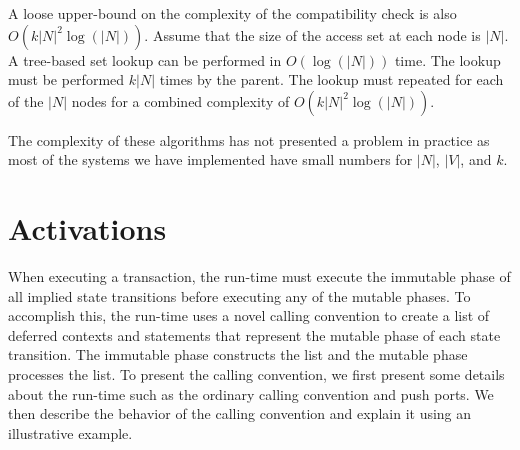 A loose upper-bound on the complexity of the compatibility check is also $O(k |N|^2 \log (|N|))$.
Assume that the size of the access set at each node is $|N|$.
A tree-based set lookup can be performed in $O(\log(|N|))$ time.
The lookup must be performed $k |N|$ times by the parent.
The lookup must repeated for each of the $|N|$ nodes for a combined complexity of $O(k |N|^2 \log (|N|))$.

The complexity of these algorithms has not presented a problem in practice as most of the systems we have implemented have small numbers for $|N|$, $|V|$, and $k$.

\section{Activations}
\label{activations}

When executing a transaction, the run-time must execute the immutable phase of all implied state transitions before executing any of the mutable phases.
To accomplish this, the run-time uses a novel calling convention to create a list of deferred contexts and statements that represent the mutable phase of each state transition.
The immutable phase constructs the list and the mutable phase processes the list.
To present the calling convention, we first present some details about the run-time such as the ordinary calling convention and push ports.
We then describe the behavior of the calling convention and explain it using an illustrative example.

